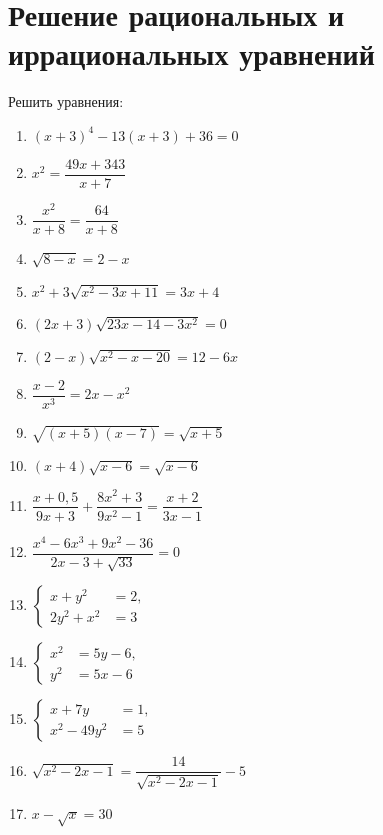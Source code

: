 \documentclass[12pt, a4paper]{article}
\begin{document}
		

\section*{Решение рациональных и иррациональных уравнений}
Решить уравнения:
\begin{multicols}{2}
	\begin{enumerate}
		\item $(x+3)^4-13(x+3)+36=0$
		\item $x^2=\dfrac{49x+343}{x+7}$
		\item $\dfrac{x^2}{x+8}=\dfrac{64}{x+8}$
		\item $\sqrt{8-x}=2-x$
		\item $x^2+3\sqrt{x^2-3x+11}=3x+4$
		\item $(2x+3)\sqrt{23x-14-3x^2}=0$
		\item $(2-x)\sqrt{x^2-x-20}=12-6x$
		\item $\dfrac{x-2}{x^3}=2x-x^2$
		\item $\sqrt{(x+5)(x-7)}=\sqrt{x+5}$
		\item $(x+4)\sqrt{x-6}=\sqrt{x-6}$
		\item $\dfrac{x+0,5}{9x+3}+\dfrac{8x^2+3}{9x^2-1}=\dfrac{x+2}{3x-1}$
		\item $\dfrac{x^4-6x^3+9x^2-36}{2x-3+\sqrt{33}}=0$
		\item $\left\{
		\begin{aligned}
			x+y^2&=2,\\
			2y^2+x^2&=3
		\end{aligned}
		\right.$
		\item $\left\{
		\begin{aligned}
			x^2&=5y-6,\\
			y^2&=5x-6
		\end{aligned}
		\right.$
		\item $\left\{
		\begin{aligned}
			x+7y&=1,\\
			x^2-49y^2&=5
		\end{aligned}
		\right.$
		\item $\sqrt{x^2-2x-1}=\dfrac{14}{\sqrt{x^2-2x-1}}-5$
		\item $x-\sqrt{x}=30$
	\end{enumerate}
\end{multicols}
\end{document}
